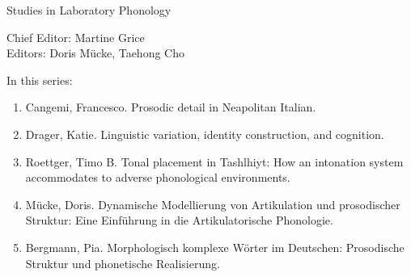 
{\raggedleft{}}

\bigskip

{\large Studies in Laboratory Phonology}

\bigskip

Chief Editor:  Martine Grice%
\\
Editors:    Doris Mücke, %
    Taehong Cho %

\bigskip

In this series:

\begin{enumerate}
\item Cangemi, Francesco. Prosodic detail in Neapolitan Italian.
\item Drager, Katie. Linguistic variation, identity construction, and cognition.
\item Roettger, Timo B. Tonal placement in Tashlhiyt: How an intonation system accommodates to adverse phonological environments.
\item Mücke, Doris. Dynamische Modellierung von Artikulation und prosodischer Struktur: Eine Einführung in die Artikulatorische Phonologie.
\item Bergmann, Pia. Morphologisch komplexe Wörter im Deutschen: Prosodische Struktur und phonetische Realisierung.
\end{enumerate}






